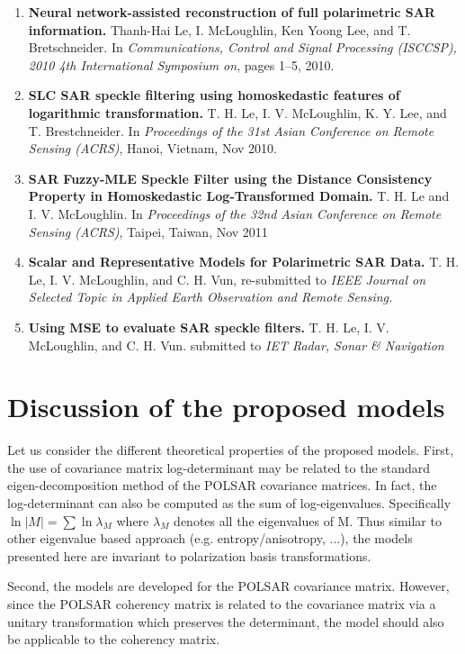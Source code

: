 \begin{enumerate}
\item \textbf{Neural network-assisted reconstruction of full polarimetric SAR information.}
  Thanh-Hai Le, I. McLoughlin, Ken Yoong Lee, and T. Bretschneider.
  In \textit{Communications, Control and Signal Processing (ISCCSP), 2010 4th International Symposium on}, pages 1–5, 2010.  \cite{Le_2010_ISCCSP} 
\item \textbf{SLC SAR speckle filtering using homoskedastic features of logarithmic transformation.}
  T. H. Le, I. V. McLoughlin, K. Y. Lee, and T. Brestchneider.
  In \textit{Proceedings of the 31st Asian Conference on Remote Sensing (ACRS)}, Hanoi, Vietnam, Nov 2010. \cite{Le_2010_ACRS}
\item  \textbf{SAR Fuzzy-MLE Speckle Filter using the Distance Consistency Property in Homoskedastic Log-Transformed Domain.}
  T. H. Le and I. V. McLoughlin. 
  In \textit{Proceedings of the 32nd Asian Conference on Remote Sensing (ACRS)}, Taipei, Taiwan, Nov 2011 \cite{Le_2011_ACRS}
\item \textbf{Scalar and Representative Models for Polarimetric SAR Data.}
  T. H. Le, I. V. McLoughlin, and C. H. Vun,
  re-submitted to \textit{IEEE Journal on Selected Topic in Applied Earth Observation and Remote Sensing.}
\item \textbf{Using MSE to evaluate SAR speckle filters.}
  T. H. Le, I. V. McLoughlin, and C. H. Vun.
  submitted to \textit{IET Radar, Sonar \& Navigation}
\end{enumerate}
  
\section{Discussion of the proposed models}

Let us consider the different theoretical properties of the proposed models.
First, the use of covariance matrix log-determinant may be related to the standard eigen-decomposition method of the POLSAR covariance matrices.
In fact, the log-determinant can also be computed as the sum of log-eigenvalues.
Specifically $\ln{|M|} = \sum \ln{\lambda_M}$ where $\lambda_M$ denotes all the eigenvalues of M.
Thus similar to other eigenvalue based approach (e.g. entropy/anisotropy, ...),
  the models presented here are invariant to polarization basis transformations.

Second, the models are developed for the POLSAR covariance matrix.
However, since the POLSAR coherency matrix is related to the covariance matrix via a unitary transformation which preserves the determinant,
  the model should also be applicable to the coherency matrix.

